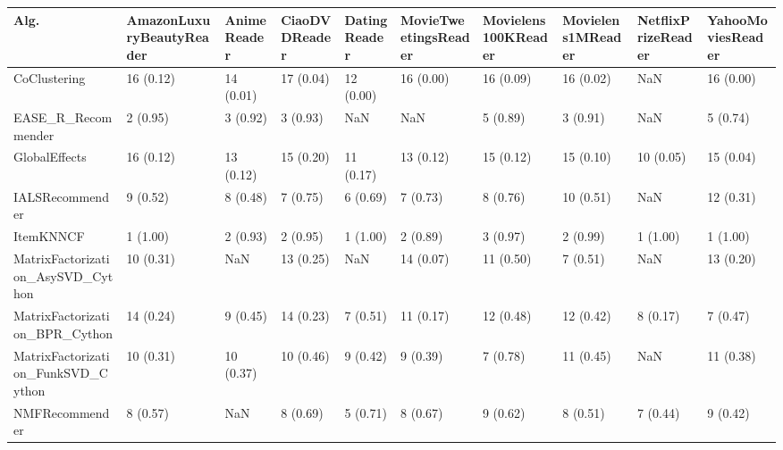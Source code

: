 \begin{tabular}{llllllllll}
\toprule
                               Alg. & AmazonLuxuryBeautyReader & AnimeReader & CiaoDVDReader & DatingReader & MovieTweetingsReader & Movielens100KReader & Movielens1MReader & NetflixPrizeReader & YahooMoviesReader \\
\midrule
                       CoClustering &                16 (0.12) &   14 (0.01) &     17 (0.04) &    12 (0.00) &            16 (0.00) &           16 (0.09) &         16 (0.02) &                NaN &         16 (0.00) \\
                 EASE\_R\_Recommender &                 2 (0.95) &    3 (0.92) &      3 (0.93) &          NaN &                  NaN &            5 (0.89) &          3 (0.91) &                NaN &          5 (0.74) \\
                      GlobalEffects &                16 (0.12) &   13 (0.12) &     15 (0.20) &    11 (0.17) &            13 (0.12) &           15 (0.12) &         15 (0.10) &          10 (0.05) &         15 (0.04) \\
                    IALSRecommender &                 9 (0.52) &    8 (0.48) &      7 (0.75) &     6 (0.69) &             7 (0.73) &            8 (0.76) &         10 (0.51) &                NaN &         12 (0.31) \\
                          ItemKNNCF &                 1 (1.00) &    2 (0.93) &      2 (0.95) &     1 (1.00) &             2 (0.89) &            3 (0.97) &          2 (0.99) &           1 (1.00) &          1 (1.00) \\
  MatrixFactorization\_AsySVD\_Cython &                10 (0.31) &         NaN &     13 (0.25) &          NaN &            14 (0.07) &           11 (0.50) &          7 (0.51) &                NaN &         13 (0.20) \\
     MatrixFactorization\_BPR\_Cython &                14 (0.24) &    9 (0.45) &     14 (0.23) &     7 (0.51) &            11 (0.17) &           12 (0.48) &         12 (0.42) &           8 (0.17) &          7 (0.47) \\
 MatrixFactorization\_FunkSVD\_Cython &                10 (0.31) &   10 (0.37) &     10 (0.46) &     9 (0.42) &             9 (0.39) &            7 (0.78) &         11 (0.45) &                NaN &         11 (0.38) \\
                     NMFRecommender &                 8 (0.57) &         NaN &      8 (0.69) &     5 (0.71) &             8 (0.67) &            9 (0.62) &          8 (0.51) &           7 (0.44) &          9 (0.42) \\

\end{tabular}
